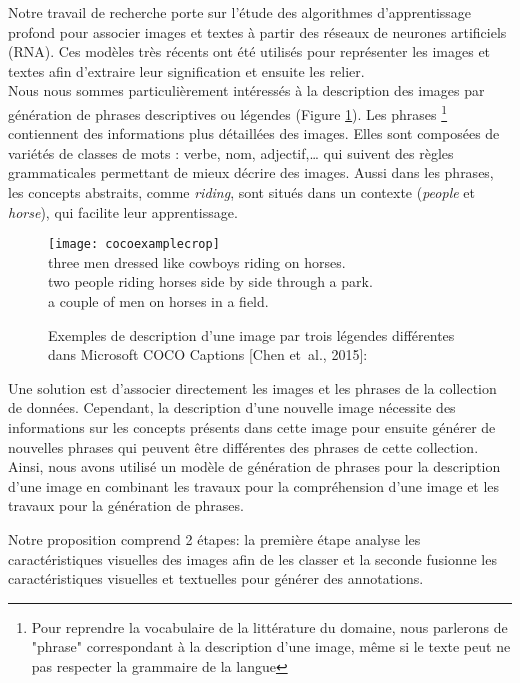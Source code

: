 \qquad Notre travail de  recherche porte sur l'étude des algorithmes d’apprentissage profond pour associer images et textes à partir des réseaux de neurones artificiels (RNA). Ces modèles très récents ont été utilisés pour représenter les images et textes afin d'extraire leur signification et ensuite les relier.\\
Nous nous sommes particulièrement intéressés à la description des images par génération de phrases descriptives ou légendes (Figure \ref{fig:phrase}). 
Les phrases \footnote{Pour reprendre la vocabulaire de la littérature du domaine, nous parlerons de "phrase" correspondant à la description d'une image, même si le texte peut ne pas respecter la grammaire de la langue} contiennent des informations plus détaillées des images. Elles sont composées de variétés de classes de mots : verbe, nom, adjectif,… qui suivent des règles grammaticales permettant de mieux décrire des images. Aussi dans les phrases, les concepts abstraits, comme \textit{riding}, sont situés dans un contexte  (\textit{people} et \textit{horse}), qui facilite leur apprentissage.
\begin{figure}[h]
	\begin{center}
		\texttt{[image: cocoexamplecrop]}
		 \\three men dressed like cowboys riding on horses. \\two people riding horses side by side through a park. \\a couple of men on horses in a field.
		\caption{Exemples de description d'une image par trois légendes différentes dans Microsoft COCO Captions [Chen et~al., 2015]: }
		\label{fig:phrase}
	\end{center}
\end{figure}

Une solution est d'associer directement les images et les phrases de la collection de données. Cependant, la description d'une nouvelle image nécessite des informations sur les concepts présents dans cette image pour ensuite générer de nouvelles phrases qui peuvent être différentes des phrases de cette collection. Ainsi, nous avons utilisé un modèle de génération de phrases pour la description d'une image en combinant les travaux pour la compréhension d'une image et les travaux pour la génération de phrases.

Notre proposition comprend 2 étapes: la première étape analyse les caractéristiques visuelles des images afin de les classer et la seconde fusionne les caractéristiques visuelles et textuelles pour générer des annotations.

